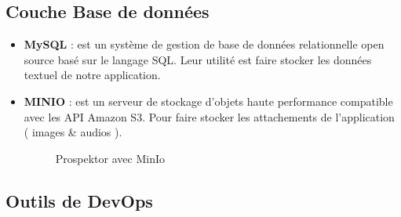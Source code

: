 \subsection{Couche Base de donn\'ees}
\begin{itemize}
\item \textbf{MySQL} : est un syst\`eme de gestion de base de donn\'ees relationnelle open source bas\'e sur le langage \gls{SQL}. Leur utilit\'e est faire stocker les donn\'ees textuel de notre application.
\item \textbf{MINIO} : est un serveur de stockage d'objets haute performance compatible avec les API Amazon S3. Pour faire stocker les attachements de l'application ( images \& audios ).

\begin{figure}[H]
	\caption{\label{fig:my-label} Prospektor avec MinIo}
\end{figure}
\end{itemize}

\subsection{Outils de DevOps}

